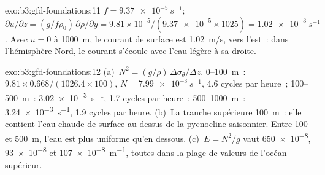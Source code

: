 \begin{solution}{exo:b3:gfd-foundations:11}
$f = \qty{9.37e-5}{s^{-1}}$; $\partial u/\partial z = (g/f\rho_0)\,\partial
\rho/\partial y = 9.81\times10^{-5}/(\num{9.37e-5}\times1025) =
\qty{1.02e-3}{s^{-1}}$. Avec $u = 0$ à \qty{1000}{m}, le courant de surface est
\qty{1.02}{m/s}, vers l'est~: dans l'hémisphère Nord, le courant s'écoule avec
l'eau légère à sa droite.
\end{solution}

\begin{solution}{exo:b3:gfd-foundations:12}
(a)~$N^2 = (g/\rho)\,\Delta\sigma_\theta/\Delta z$. 0--\qty{100}{m}~:
$9.81\times0.668/(1026.4\times100)$, $N = \qty{7.99e-3}{s^{-1}}$, 4.6
cycles par heure~; 100--\qty{500}{m}~: \qty{3.02e-3}{s^{-1}}, 1.7 cycles par
heure~; 500--\qty{1000}{m}~: \qty{3.24e-3}{s^{-1}}, 1.9 cycles par heure.
(b)~La tranche supérieure \qty{100}{m}~: elle contient l'eau chaude de surface au-dessus de la
pycnocline saisonnier. Entre 100 et \qty{500}{m}, l'eau est plus
uniforme qu'en dessous. (c)~$E = N^2/g$ vaut \num{650e-8}, \num{93e-8} et
\qty{107e-8}{m^{-1}}, toutes dans la plage de valeurs de l'océan supérieur.
\end{solution}


